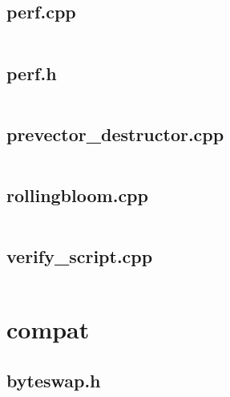\documentclass{article}
\begin{document}
\subsection{perf.cpp}
\inputminted{cpp}{/home/dufferzafar/dev/@clones/bitcoin/src/bench/perf.cpp}
\newpage

\subsection{perf.h}
\inputminted{cpp}{/home/dufferzafar/dev/@clones/bitcoin/src/bench/perf.h}
\newpage

\subsection{prevector\_destructor.cpp}
\inputminted{cpp}{/home/dufferzafar/dev/@clones/bitcoin/src/bench/prevector_destructor.cpp}
\newpage

\subsection{rollingbloom.cpp}
\inputminted{cpp}{/home/dufferzafar/dev/@clones/bitcoin/src/bench/rollingbloom.cpp}
\newpage

\subsection{verify\_script.cpp}
\inputminted{cpp}{/home/dufferzafar/dev/@clones/bitcoin/src/bench/verify_script.cpp}
\newpage



\section{compat}

\subsection{byteswap.h}
\inputminted{cpp}{/home/dufferzafar/dev/@clones/bitcoin/src/compat/byteswap.h}
\newpage
\end{document}
